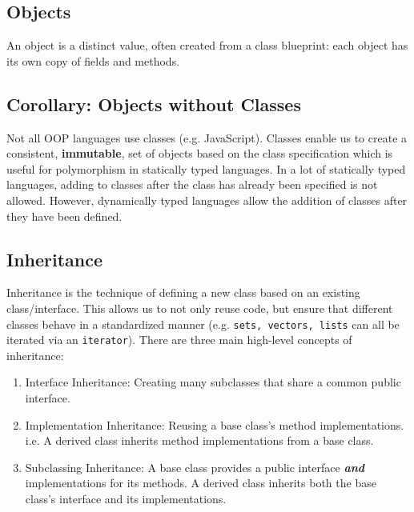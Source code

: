 \documentclass{article}
\begin{document}
\subsection{Objects}
An object is a distinct value, often created from a class blueprint:
each object has its own copy of fields and methods.

\subsection*{Corollary: Objects without Classes}
Not all OOP languages use classes (e.g. JavaScript). Classes enable us
to create a consistent, \textbf{immutable}, set of objects based on the class
specification which is useful for polymorphism in statically typed
languages. In a lot of statically typed languages, adding to classes
after the class has already been specified is not allowed. However,
dynamically typed languages allow the addition of classes after they
have been defined.

\subsection{Inheritance}
Inheritance is the technique of defining a new class based on an
existing class/interface. This allows us to not only reuse code, but
ensure that different classes behave in a standardized manner
(e.g. \texttt{sets, vectors, lists} can all be iterated via an
\texttt{iterator}). There are three main high-level concepts of inheritance:
\begin{enumerate}[label=(\roman*)]
\item Interface Inheritance: Creating many subclasses that share a
  common public interface.
\item Implementation Inheritance: Reusing a base class's method
  implementations. i.e. A derived class inherits method
  implementations from a base class.
\item Subclassing Inheritance: A base class provides a public
  interface \textit{\textbf{and}} implementations for its methods. A
  derived class inherits both the base class's interface and its implementations.
\end{enumerate}
\end{document}
